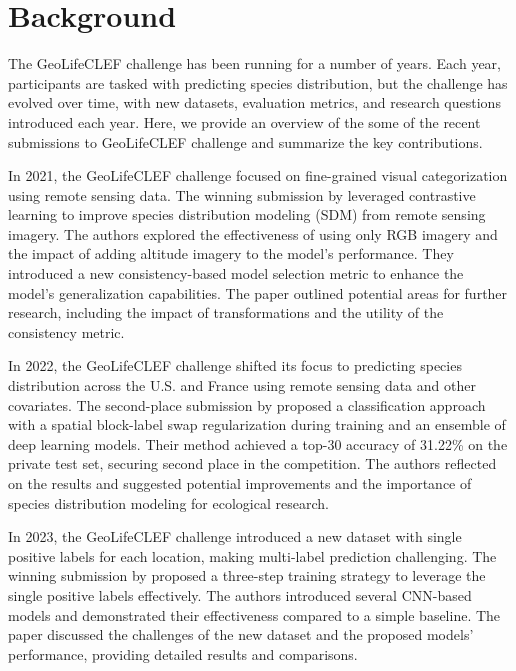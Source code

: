 \section{Background}


The GeoLifeCLEF challenge has been running for a number of years. Each year, participants are tasked with predicting species distribution, but the challenge has evolved over time, with new datasets, evaluation metrics, and research questions introduced each year. Here, we provide an overview of the some of the recent submissions to GeoLifeCLEF challenge and summarize the key contributions.

In 2021, the GeoLifeCLEF challenge focused on fine-grained visual categorization using remote sensing data. The winning submission by \cite{Seneviratne:CLEF-2021} leveraged contrastive learning to improve species distribution modeling (SDM) from remote sensing imagery. The authors explored the effectiveness of using only RGB imagery and the impact of adding altitude imagery to the model's performance. They introduced a new consistency-based model selection metric to enhance the model's generalization capabilities. The paper outlined potential areas for further research, including the impact of transformations and the utility of the consistency metric.

In 2022, the GeoLifeCLEF challenge shifted its focus to predicting species distribution across the U.S. and France using remote sensing data and other covariates. The second-place submission by \cite{KellenbergerDevis:CLEF2022} proposed a classification approach with a spatial block-label swap regularization during training and an ensemble of deep learning models. Their method achieved a top-30 accuracy of 31.22\% on the private test set, securing second place in the competition. The authors reflected on the results and suggested potential improvements and the importance of species distribution modeling for ecological research.

In 2023, the GeoLifeCLEF challenge introduced a new dataset with single positive labels for each location, making multi-label prediction challenging. The winning submission by \cite{UngKojimaWada:CLEF2023} proposed a three-step training strategy to leverage the single positive labels effectively. The authors introduced several CNN-based models and demonstrated their effectiveness compared to a simple baseline. The paper discussed the challenges of the new dataset and the proposed models' performance, providing detailed results and comparisons.
